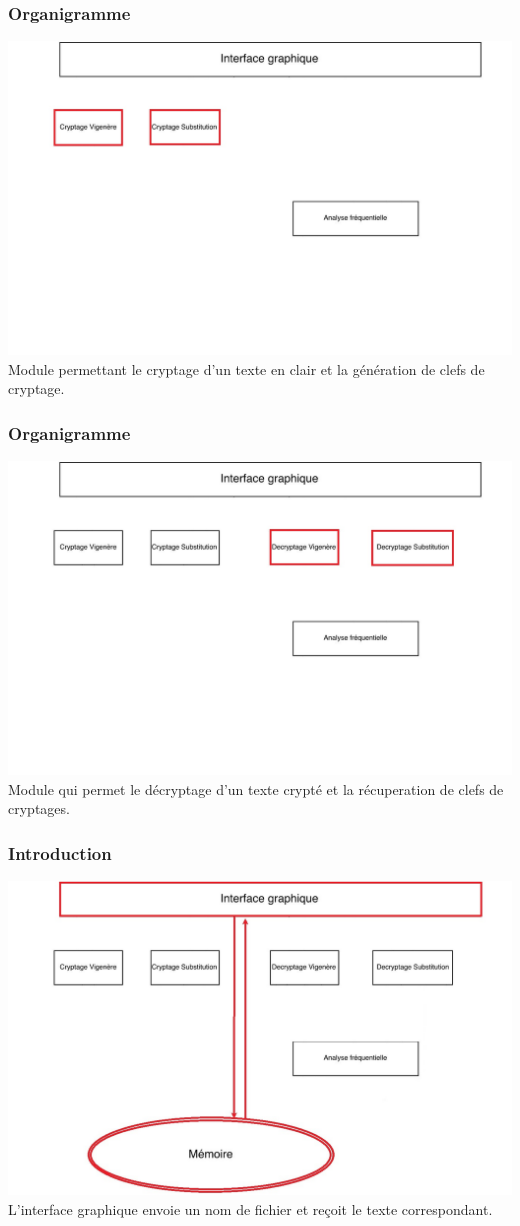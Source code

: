\documentclass[10pt,xcolor=table]{beamer}
\begin{document}
\begin{frame}
  \frametitle{Organigramme}
\includegraphics[scale = 0.28]{Org3.jpg}\\
Module permettant le cryptage d'un texte en clair et la génération de clefs de cryptage.
\end{frame}
\begin{frame}
  \frametitle{Organigramme}
\includegraphics[scale = 0.28]{Org4.jpg}\\
Module qui permet le décryptage d'un texte crypté et la récuperation de clefs de cryptages.
\end{frame}
\begin{frame}
  \frametitle{Introduction}
\includegraphics[scale = 0.28]{Org5.jpg}\\
L'interface graphique envoie un nom de fichier et reçoit le texte correspondant.
\end{frame}
\end{document}
